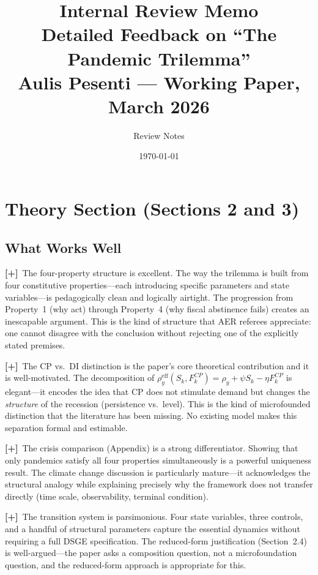 \documentclass[12pt, a4paper]{article}
\title{\textbf{Internal Review Memo} \\[0.5em]
\large Detailed Feedback on ``The Pandemic Trilemma'' \\[0.3em]
\normalsize Aulis Pesenti --- Working Paper, March 2026}
\author{Review Notes}
\date{\today}
\newcommand{\strength}[1]{\textcolor{strength}{\textbf{[+]}~#1}}
\begin{document}
\maketitle

\tableofcontents
\newpage

\section{Theory Section (Sections 2 and 3)}

\subsection{What Works Well}

\strength{The four-property structure is excellent.} The way the trilemma is built from four constitutive properties---each introducing specific parameters and state variables---is pedagogically clean and logically airtight. The progression from Property~1 (why act) through Property~4 (why fiscal abstinence fails) creates an inescapable argument. This is the kind of structure that AER referees appreciate: one cannot disagree with the conclusion without rejecting one of the explicitly stated premises.

\strength{The CP vs.\ DI distinction is the paper's core theoretical contribution} and it is well-motivated. The decomposition of $\rho_y^{\text{eff}}(S_k, F_k^{CP}) = \rho_y + \psi S_k - \eta F_k^{CP}$ is elegant---it encodes the idea that CP does not stimulate demand but changes the \textit{structure} of the recession (persistence vs.\ level). This is the kind of microfounded distinction that the literature has been missing. No existing model makes this separation formal and estimable.

\strength{The crisis comparison (Appendix) is a strong differentiator.} Showing that only pandemics satisfy all four properties simultaneously is a powerful uniqueness result. The climate change discussion is particularly mature---it acknowledges the structural analogy while explaining precisely why the framework does not transfer directly (time scale, observability, terminal condition).

\strength{The transition system is parsimonious.} Four state variables, three controls, and a handful of structural parameters capture the essential dynamics without requiring a full DSGE specification. The reduced-form justification (Section~2.4) is well-argued---the paper asks a composition question, not a microfoundation question, and the reduced-form approach is appropriate for this.
\end{document}
